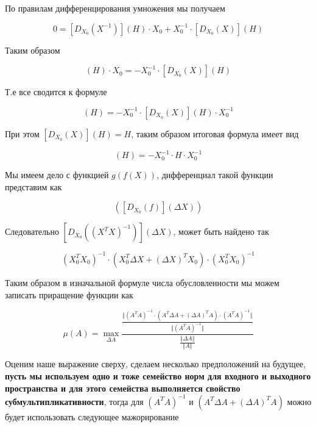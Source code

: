 \documentclass{article}
\begin{document}
    По правилам дифференцирования умножения мы получаем

    \begin{equation}
        0 = [D_{X_{0}} (X^{-1})](H) \cdot X_{0} + X_{0}^{-1} \cdot [D_{X_{0}} (X)](H)
    \end{equation}

    Таким образом

    \begin{equation}
        [D_{X_{0}} (X^{-1})](H) \cdot X_{0} = - X_{0}^{-1} \cdot [D_{X_{0}} (X)](H)
    \end{equation}

    Т.е все сводится к формуле

    \begin{equation}
        [D_{X_{0}} (X^{-1})](H) = - X_{0}^{-1} \cdot [D_{X_{0}} (X)](H) \cdot X_{0}^{-1}
    \end{equation}

    При этом $[D_{X_{0}} (X)](H) = H$, таким образом итоговая формула имеет вид

    \begin{equation}
        [D_{X_{0}} (X^{-1})](H) = - X_{0}^{-1} \cdot H \cdot X_{0}^{-1}
    \end{equation}

    Мы имеем дело с функцией $g(f(X))$, дифференциал такой функции представим как

    \begin{equation}
        [D_{f(X_{0})} (g)]([D_{X_{0}} (f)] (\Delta X))
    \end{equation}

    Следовательно $[D_{X_{0}} ((X^{T} X)^{-1})](\Delta X)$, может быть найдено так

    \begin{equation}
       (X_{0}^{T} X_{0})^{-1} \cdot (X_{0}^{T} \Delta X + (\Delta X)^{T} X_{0}) \cdot (X_{0}^{T} X_{0})^{-1}
    \end{equation}

    Таким образом в изначальной формуле числа обусловленности мы можем записать приращение функции как

    \begin{equation}
        \mu(A) = \max_{\Delta A} \frac{ \frac{\Vert  (A^{T} A)^{-1} \cdot (A^{T} \Delta A + (\Delta A)^{T} A) \cdot (A^{T} A)^{-1} \Vert }{\Vert (A^T A)^{-1} \Vert} }{ \frac{\Vert \Delta A \Vert}{\Vert A \Vert} }
    \end{equation}

    Оценим наше выражение сверху, сделаем несколько предположений на будущее, \textbf{пусть мы используем одно и тоже семейство норм для входного и выходного пространства и для этого семейства выполняется свойство субмультипликативности},
    тогда для $(A^{T} A)^{-1}$ и $(A^{T} \Delta A + (\Delta A)^{T} A)$ можно будет использовать следующее мажорирование
\end{document}
